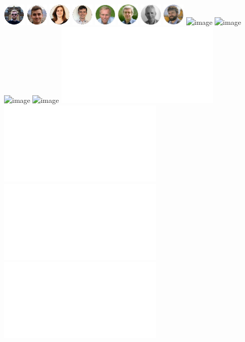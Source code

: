 \documentclass[aspectratio=169]{beamer}
\begin{document}
\begin{frame}
\begin{columns}
        \includegraphics[width=0.08\textwidth]{figures/headshots/tamas-stenzel-polychord.jpg}%
        \includegraphics[width=0.08\textwidth]{figures/headshots/david-yallup-polychord.jpg}%
        \includegraphics[width=0.08\textwidth]{figures/headshots/rebecca-handley-polychord.jpg}%
        \includegraphics[width=0.08\textwidth]{figures/headshots/adam-ormondroyd-polychord.jpg}%
        \includegraphics[width=0.08\textwidth]{figures/headshots/mike-hobson-polychord.jpg}%
        \includegraphics[width=0.08\textwidth]{figures/headshots/anthony-lasenby-polychord.jpg}%
        \includegraphics[width=0.08\textwidth]{figures/headshots/mike-handley-polychord.jpg}%
        \includegraphics[width=0.08\textwidth]{figures/headshots/will-handley-polychord.jpg}%
        \includegraphics<1|handout:0>[width=\textwidth]{figures/protein_1.png}%
        \includegraphics<2          >[width=\textwidth]{figures/protein_2.png}%
        \includegraphics<3|handout:0>[width=\textwidth]{figures/protein_3.png}%
        \includegraphics<4|handout:0>[width=\textwidth]{figures/lcoe.png}%
        \includegraphics<5|handout:0>[width=\textwidth]{figures/DKL_contour-cropped-crop.pdf}%
        \includegraphics<6|handout:0>[width=\textwidth]{figures/mean_DKL_optimise-3-crop.pdf}%
        \includegraphics<7|handout:0>[width=\textwidth]{figures/mean_DKL_optimise-4-crop.pdf}%
        \includegraphics<8|handout:0>[width=\textwidth]{figures/mean_DKL_optimise-5-crop.pdf}%
    \end{columns}
\end{frame}
\end{document}
